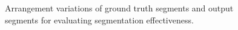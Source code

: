 \begin{figure}
    \centering
    {%
    \setlength{\fboxsep}{0pt}%
    \setlength{\fboxrule}{1pt}%
    }%
    \caption{Arrangement variations of
    ground truth segments and output segments
    for evaluating segmentation effectiveness.
    }
    \label{fig:possible-intersections}
\end{figure}
